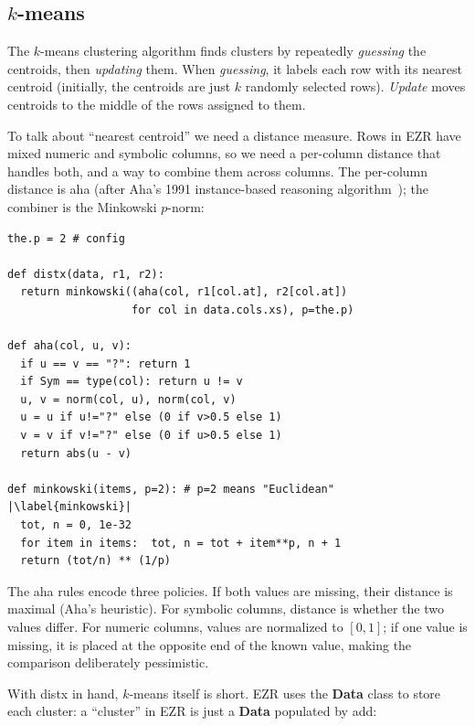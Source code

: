 \documentclass[AMA,STIX2COL]{WileyNJDv5}
\newcommand{\IT}{{\sffamily EZR}}
\newcommand{\cls}[1]{%
  \setlength{\fboxsep}{1.5pt}%
  \colorbox{clsbg}{\sffamily\bfseries{#1}}%
}
\begin{document}
\subsection{$k$-means}\label{kluster}

The $k$-means clustering algorithm finds clusters by repeatedly
{\em guessing} the centroids, then {\em updating} them.  When
{\em guessing}, it labels each row with its nearest centroid
(initially, the centroids are just $k$ randomly selected rows).
{\em Update} moves centroids to the middle of the rows assigned
to them.

To talk about ``nearest centroid'' we need a distance measure. Rows in
\IT{} have mixed numeric and symbolic columns, so we need a
per-column distance that handles both, and a way to combine them
across columns. The per-column distance is \textsf{aha} (after
Aha's 1991 instance-based reasoning algorithm~\cite{aha91}); the
combiner is the Minkowski $p$-norm:

\begin{verbatim}
the.p = 2 # config

def distx(data, r1, r2):
  return minkowski((aha(col, r1[col.at], r2[col.at])
                   for col in data.cols.xs), p=the.p)

def aha(col, u, v):
  if u == v == "?": return 1
  if Sym == type(col): return u != v
  u, v = norm(col, u), norm(col, v)
  u = u if u!="?" else (0 if v>0.5 else 1)
  v = v if v!="?" else (0 if u>0.5 else 1)
  return abs(u - v)

def minkowski(items, p=2): # p=2 means "Euclidean"  |\label{minkowski}|
  tot, n = 0, 1e-32
  for item in items:  tot, n = tot + item**p, n + 1
  return (tot/n) ** (1/p)
\end{verbatim}
The \textsf{aha} rules encode three   policies. If both
values are missing, their distance is maximal (Aha's
heuristic). For symbolic columns, distance is whether the two
values differ. For numeric columns, values are normalized to
$[0,1]$; if one value is missing, it is placed at the opposite
end of the known value, making the comparison deliberately
pessimistic.

With \textsf{distx} in hand, $k$-means itself is short. EZR uses
the \cls{Data} class to store each cluster: a ``cluster'' in
\IT{} is just a \cls{Data} populated by \textsf{add}:
\end{document}
